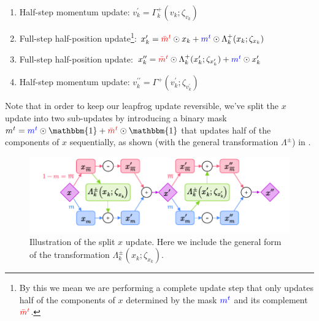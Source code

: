 \documentclass{article} %
\newcommand{\mbart}{\textcolor{red}{\bar{m}^{t}}}
\newcommand{\mt}{\textcolor{blue}{m^{t}}}
\begin{document}
\begin{enumerate}
   \item Half-step momentum update:%
      \hspace{29pt}\(%
         v^{\prime}_{k} = \Gamma^{+}_{k}(v_{k};\zeta_{v_{k}})%
   \)
   \item Full-step half-position update\footnote{By this we mean we are performing a complete update step that only
      updates half of the components of \(x\) determined by the mask \(\mt\) and its complement \(\mbart\).}:
      \hspace{17pt} \(%
         x^{\prime}_{k} = \mbart\odot x_{k} + \mt\odot \Lambda^{+}_{k}(x_{k};\zeta_{x_{k}})
   \)
   \item Full-step half-position update:%
      \hspace{20pt} \(%
         x^{\prime\prime}_{k} = \mbart\odot\Lambda^{+}_{k}(x^{\prime}_{k};\zeta_{x^{\prime}_{k}}) + \mt\odot x^{\prime}_{k}
   \)
   \item Half-step momentum update:%
      \hspace{24pt} \(%
         v^{\prime\prime}_{k} = \Gamma^{+}(v^{\prime}_{k}; \zeta_{v^{\prime}_{k}})
   \)
\end{enumerate}
%
Note that in order to keep our leapfrog update reversible, we've split the \(x\) update into two sub-updates by
introducing a binary mask \(m^{t} = \mt\odot\mathbbm{1} + \mbart\odot\mathbbm{1}\) that updates half of the components
of \(x\) sequentially, as shown (with the general transformation \(\Lambda^{\pm}\)) in .
%
\begin{figure}[htpb]
   \centering
   \includegraphics[width=\textwidth]{figures/splitx10.pdf}
   \caption{\label{fig:splitx}Illustration of the split \(x\) update. Here we include the general form of the
   transformation \(\Lambda^{\pm}_{k}(x_{k};\zeta_{x_{k}})\).}
\end{figure}
%
\end{document}
